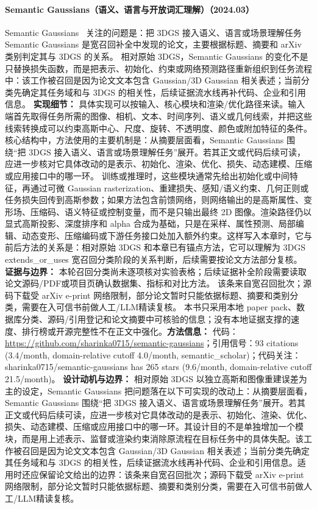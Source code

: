 \paragraph{Semantic Gaussians（语义、语言与开放词汇理解）（2024.03）}
Semantic Gaussians~\cite{2403_15624} 关注的问题是：把 3DGS 接入语义、语言或场景理解任务 Semantic Gaussians 是宽召回补全中发现的论文，主要根据标题、摘要和 arXiv 类别判定其与 3DGS 的关系。
相对原始 3DGS，Semantic Gaussians 的变化不是只替换损失函数，而是把表示、初始化、约束或网络预测路径重新组织到任务流程中：该工作被召回是因为论文文本包含 Gaussian/3D Gaussian 相关表述；当前分类先确定其任务域和与 3DGS 的相关性，后续证据流水线再补代码、企业和引用信息。
\textbf{实现细节：} 具体实现可以按输入、核心模块和渲染/优化路径来读。输入端首先取得任务所需的图像、相机、文本、时间序列、语义或几何线索，并把这些线索转换成可以约束高斯中心、尺度、旋转、不透明度、颜色或附加特征的条件。核心结构中，方法使用的主要机制是：从摘要层面看，Semantic Gaussians 围绕“把 3DGS 接入语义、语言或场景理解任务”展开。若其正文或代码后续可读，应进一步核对它具体改动的是表示、初始化、渲染、优化、损失、动态建模、压缩或应用接口中的哪一环。 训练或推理时，这些模块通常先给出初始化或中间特征，再通过可微 Gaussian rasterization、重建损失、感知/语义约束、几何正则或任务损失回传到高斯参数；如果方法包含前馈网络，则网络输出的是高斯属性、变形场、压缩码、语义特征或控制变量，而不是只输出最终 2D 图像。渲染路径仍以显式高斯投影、深度排序和 alpha 合成为基础，只是在采样、属性预测、局部编辑、动态变形、压缩编码或下游任务接口处加入额外约束。这样写入本章时，它与前后方法的关系是：相对原始 3DGS 和本章已有锚点方法，它可以理解为 3DGS extends\_or\_uses 宽召回分类阶段的关系判断，后续需要按论文方法部分复核。
\textbf{证据与边界：} 本轮召回分类尚未逐项核对实验表格；后续证据补全阶段需要读取论文源码/PDF或项目页确认数据集、指标和对比方法。 该条来自宽召回批次；源码下载受 arXiv e-print 网络限制，部分论文暂时只能依据标题、摘要和类别分类，需要在入可信书前做人工/LLM精读复核。 本书只采用本地 paper pack、数据库分类、源码/引用登记和论文摘要中可核验的信息；没有本地证据支撑的速度、排行榜或开源完整性不在正文中强化。\textbf{方法信息：} 代码：\url{https://github.com/sharinka0715/semantic-gaussians}；引用信号：93 citations (3.4/month, domain-relative cutoff 4.0/month, semantic\_scholar)；代码关注：sharinka0715/semantic-gaussians has 265 stars (9.6/month, domain-relative cutoff 21.5/month)。
\textbf{设计动机与边界：} 相对原始 3DGS 以独立高斯和图像重建误差为主的设定，Semantic Gaussians 把问题落在以下可实现的改动上：从摘要层面看，Semantic Gaussians 围绕“把 3DGS 接入语义、语言或场景理解任务”展开。若其正文或代码后续可读，应进一步核对它具体改动的是表示、初始化、渲染、优化、损失、动态建模、压缩或应用接口中的哪一环。其设计目的不是单独增加一个模块，而是用上述表示、监督或渲染约束消除原流程在目标任务中的具体失配。该工作被召回是因为论文文本包含 Gaussian/3D Gaussian 相关表述；当前分类先确定其任务域和与 3DGS 的相关性，后续证据流水线再补代码、企业和引用信息。适用时还应保留论文给出的边界：该条来自宽召回批次；源码下载受 arXiv e-print 网络限制，部分论文暂时只能依据标题、摘要和类别分类，需要在入可信书前做人工/LLM精读复核。
